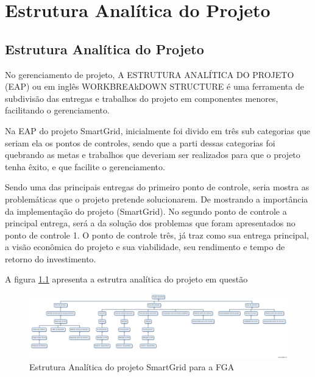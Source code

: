 \part{Estrutura Analítica do Projeto}
\chapter[Estrutura Analítica do Projeto]{Estrutura Analítica do Projeto}

No gerenciamento de projeto, A ESTRUTURA ANALÍTICA DO PROJETO (EAP) ou em inglês WORKBREAkDOWN STRUCTURE é uma ferramenta de subdivisão das entregas e trabalhos do projeto em componentes menores, facilitando o gerenciamento.

Na EAP do projeto SmartGrid, inicialmente foi divido em três sub categorias que seriam ela os pontos de controles, sendo que a parti dessas categorias foi quebrando as metas e trabalhos que deveriam ser realizados para que o projeto tenha êxito, e que facilite o gerenciamento. 

Sendo uma das principais entregas do primeiro ponto de controle, seria mostra as problemáticas que o projeto pretende solucionarem. De mostrando a importância da implementação do projeto (SmartGrid). No segundo ponto de controle a principal entrega, será a da solução dos problemas que foram apresentados no ponto de controle 1. O ponto de controle três, já traz como sua entrega principal, a visão econômica do projeto e sua viabilidade, seu rendimento e tempo de retorno do investimento.

A figura \ref{fig:eap} apresenta a estrutra analítica do projeto em questão

\begin{figure}[!h]
	\centering
	\includegraphics[scale=.7]{figuras/EAP.jpg}
	\caption{Estrutura Analítica do projeto SmartGrid para a FGA}
	\label{fig:eap}
\end{figure}